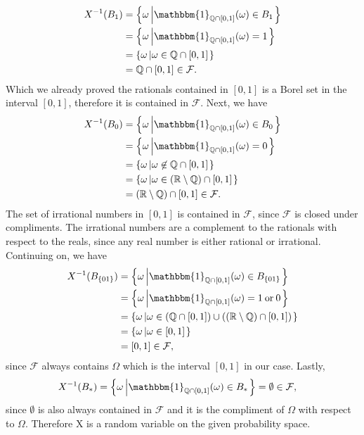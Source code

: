 \documentclass[10pt]{amsart}
\begin{document}
\begin{align*}
X^{-1}(B_1) &= \left\{ \omega \left| \mathbbm{1}_{\mathbb{Q} \cap [0, 1]}(\omega) \in B_1 \right.\right\} \\
		  &= \left\{ \omega \left| \mathbbm{1}_{\mathbb{Q} \cap [0, 1]}(\omega) = 1 \right.\right\} \\
		  &= \left\{ \omega \left| \omega \in \mathbb{Q} \cap [0, 1] \right.\right\} \\
		  &= \mathbb{Q} \cap [0, 1] \in \mathcal F.
\end{align*}
Which we already proved the rationals contained in $[0, 1]$ is a Borel set in the interval $[0, 1]$, therefore it is contained in $\mathcal F$.
Next, we have
\begin{align*}
X^{-1}(B_0) &= \left\{ \omega \left| \mathbbm{1}_{\mathbb{Q} \cap [0, 1]}(\omega) \in B_0 \right.\right\} \\
		  &= \left\{ \omega \left| \mathbbm{1}_{\mathbb{Q} \cap [0, 1]}(\omega) = 0 \right.\right\} \\
		  &= \left\{ \omega \left| \omega \not \in \mathbb{Q} \cap [0, 1] \right.\right\} \\
		  &= \left\{ \omega \left| \omega \in \left(\mathbb R \setminus \mathbb{Q}\right) \cap [0, 1] \right.\right\} \\
		  &= \left(\mathbb R \setminus \mathbb{Q}\right) \cap [0, 1] \in \mathcal F.
\end{align*}
The set of irrational numbers in $[0, 1]$ is contained in $\mathcal F$, since $\mathcal F$ is closed under compliments.
The irrational numbers are a complement to the rationals with respect to the reals, since any real number is either rational or irrational. Continuing on, we have
\begin{align*}
X^{-1}(B_{\{01\}}) &= \left\{ \omega \left| \mathbbm{1}_{\mathbb{Q} \cap [0, 1]}(\omega) \in B_{\{01\}} \right.\right\} \\
		  &= \left\{ \omega \left| \mathbbm{1}_{\mathbb{Q} \cap [0, 1]}(\omega) = 1 \: \text{or} \: 0 \right.\right\} \\
		  &= \left\{ \omega \left| \omega \in \left(\mathbb{Q} \cap [0, 1]\right) \cup \left(\left(\mathbb R \setminus \mathbb{Q}\right) \cap [0, 1]\right)\right.\right\} \\
		  &= \left\{ \omega \left| \omega \in [0, 1]\right.\right\} \\
		  &= [0, 1] \in \mathcal F,
\end{align*}
since $\mathcal F$ always contains $\Omega$ which is the interval $[0, 1]$ in our case. Lastly, 
\begin{align*}
X^{-1}(B_*) &= \left\{ \omega \left| \mathbbm{1}_{\mathbb{Q} \cap [0, 1]}(\omega) \in B_* \right.\right\} = \emptyset \in \mathcal F, 
\end{align*}
since $\emptyset$ is also always contained in $\mathcal F$ and it is the compliment of $\Omega$ with respect to $\Omega$. Therefore X is a random variable on the given probability space.
\\
\end{document}
